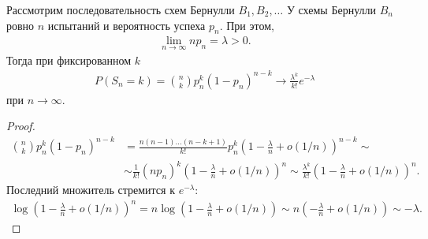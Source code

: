 \begin{thm}[%
 Пуассона]
 \label{theorem:poisson}
 Рассмотрим последовательность схем Бернулли $B_1, B_2, \ldots$ У схемы Бернулли $B_n$ ровно $n$ испытаний и вероятность успеха $p_n$. При этом,
 \begin{align*}
  \lim_{n \to \infty} np_n = \lambda > 0 
 .\end{align*} Тогда при фиксированном $k$
 \begin{align*}
  P(S_n = k) = \binom n k p_n^{k} (1-p_n)^{n-k} \to \frac{\lambda^{k}}{k!} e^{-\lambda}
 \end{align*} при $n \to \infty$.
\end{thm}
\begin{proof}
 \begin{align*}
  \binom n k p_n^{k}(1-p_n)^{n-k} &= \frac{n(n-1)\ldots(n-k+1)}{k!} p_n^{k} \left(1 - \frac{\lambda}{n} + o (1 / n)\right)^{n-k} \sim \\
  & \sim \frac{1}{k!}(np_n)^{k} \left( 1 - \frac{\lambda}{n} + o(1 / n) \right)^{n} \sim \frac{\lambda^{k}}{k!} \left( 1 - \frac{\lambda}{n} + o(1 / n) \right)^{n}
 .\end{align*}  Последний множитель стремится к $e^{-\lambda}$:
 \begin{align*}
  \log \left( 1 - \frac{\lambda}{n} + o(1 / n) \right)^{n} = n \log \left( 1 - \frac{\lambda}{n} + o(1 / n) \right) \sim n \left( - \frac{\lambda}{n} + o(1 / n) \right) \sim -\lambda
 .\end{align*} 
\end{proof}

